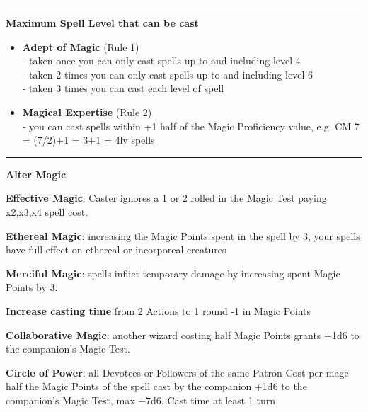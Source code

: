 \documentclass[a4paper,12 pt,openany]{book}
\newcommand{\linex}{\rule{\textwidth}{0.4pt}}
\begin{document}
\begin{textblock*}{13.5cm}
\linex

\textbf{Maximum Spell Level that can be cast}

\begin{itemize}
\item
\textbf{Adept of Magic} (Rule 1) \\
- taken once you can only cast spells up to and including level 4\\
- taken 2 times you can only cast spells up to and including level 6\\
- taken 3 times you can cast each level of spell

\item
\textbf{Magical Expertise} (Rule 2)\\
- you can cast spells within +1 half of the Magic Proficiency value, e.g. CM 7 = (7/2)+1 = 3+1 = 4lv spells

\end{itemize}

\linex

\textbf{Alter Magic}

\textbf{Effective Magic}: Caster ignores a 1 or 2 rolled in the Magic Test paying x2,x3,x4 spell cost.

\textbf{Ethereal Magic}: increasing the Magic Points spent in the spell by 3, your spells have full effect on ethereal or incorporeal creatures

\textbf{Merciful Magic}: spells inflict temporary damage by increasing spent Magic Points by 3.

\textbf{Increase casting time} from 2 Actions to 1 round -1 in Magic Points

\textbf{Collaborative Magic}: another wizard costing half Magic Points grants +1d6 to the companion's Magic Test.

\textbf{Circle of Power}: all Devotees or Followers of the same Patron
Cost per mage half the Magic Points of the spell cast by the companion +1d6 to the companion's Magic Test, max +7d6. Cast time at least 1 turn
\end{textblock*}

~\newpage
\end{document}
